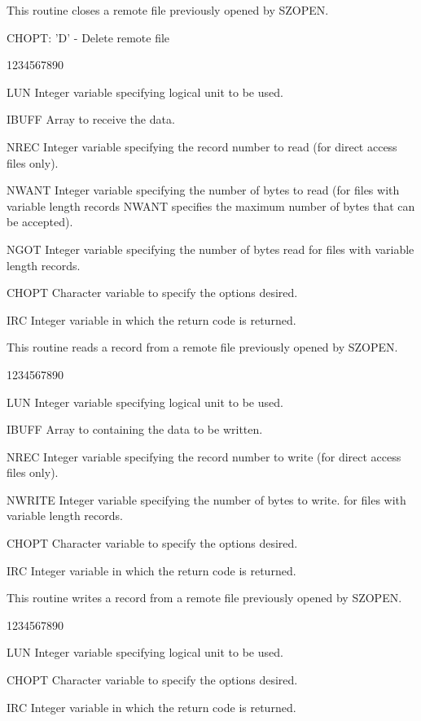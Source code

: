 \par
This routine closes a remote file previously opened by SZOPEN.
\begin{XMP}
CHOPT: 'D' - Delete remote file
\end{XMP}
\begin{DLtt}{1234567890}
\item[LUN]Integer variable specifying logical unit to be used.
\item[IBUFF]Array to receive the data.
\item[NREC]Integer variable specifying the record number to read
(for direct access files only).
\item[NWANT]Integer variable specifying the number of bytes to read
(for files with variable length records NWANT specifies the
maximum number of bytes that can be accepted).
\item[NGOT]Integer variable specifying the number of bytes read
for files with variable length records.
\item[CHOPT]Character variable to specify the options desired.
\item[IRC]Integer variable in which the return code is returned.
\end{DLtt}
\par
This routine reads a record from a remote file
previously opened by SZOPEN.
\begin{DLtt}{1234567890}
\item[LUN]Integer variable specifying logical unit to be used.
\item[IBUFF]Array to containing the data to be written.
\item[NREC]Integer variable specifying the record number to write
(for direct access files only).
\item[NWRITE]Integer variable specifying the number of bytes to write.
for files with variable length records.
\item[CHOPT]Character variable to specify the options desired.
\item[IRC]Integer variable in which the return code is returned.
\end{DLtt}
\par
This routine writes a record from a remote file
previously opened by SZOPEN.
\begin{DLtt}{1234567890}
\item[LUN]Integer variable specifying logical unit to be used.
\item[CHOPT]Character variable to specify the options desired.
\item[IRC]Integer variable in which the return code is returned.
\end{DLtt}
